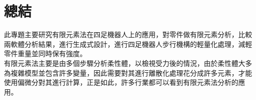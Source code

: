 \chapter{總結}
此專題主要研究有限元素法在四足機器人上的應用，對零件做有限元素分析，比較兩軟體分析結果，進行生成式設計，進行四足機器人步行機構的輕量化處理，減輕零件重量並同時保有強度。\\

有限元素法主要是由多個步驟分析柔性體，以檢視受力後的情況，由於柔性體大多為複雜模型並包含許多變量，因此需要對其進行離散化處理花分成許多元素，才能使用偏微分對其進行計算，正是如此，許多行業都可以看到有限元素法分析的應用。\\

\newpage
